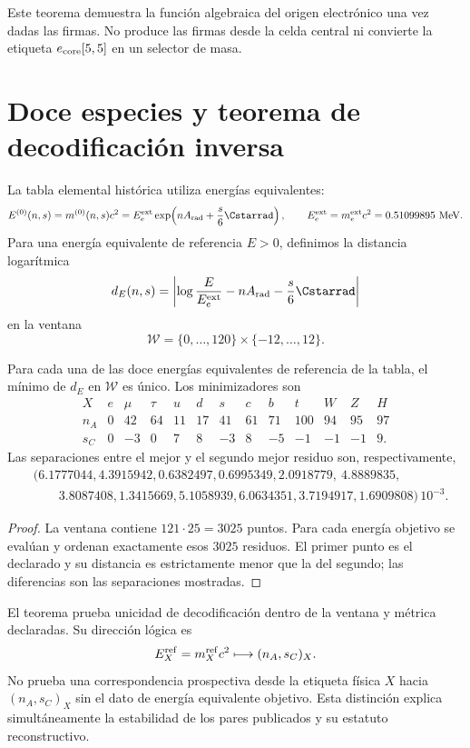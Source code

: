 Este teorema demuestra la función algebraica del origen electrónico una vez
dadas las firmas. No produce las firmas desde la celda central ni convierte
la etiqueta \(e_{\rm core}[5,5]\) en un selector de masa.

\section{Doce especies y teorema de decodificación inversa}

La tabla elemental histórica utiliza energías equivalentes:
\[
 E^{(0)}(n,s)=m^{(0)}(n,s)c^2
 =E_e^{\rm ext}
 \exp\!\left(nA_{\rm rad}+\frac{s}{6}\Cstarrad\right),
 \qquad E_e^{\rm ext}=m_e^{\rm ext}c^2
 =0.51099895\ \mathrm{MeV}.
\]
Para una energía equivalente de referencia \(E>0\), definimos la distancia logarítmica
\[
 d_E(n,s)=
 \left|
 \log\frac{E}{E_e^{\rm ext}}
 -nA_{\rm rad}-\frac{s}{6}\Cstarrad
 \right|
\]
en la ventana
\[
 \mathcal W=\{0,\ldots,120\}\times\{-12,\ldots,12\}.
\]

\begin{theorem}
\label{thm:voronoi-doce-especies}
Para cada una de las doce energías equivalentes de referencia de la tabla, el
mínimo de \(d_E\) en \(\mathcal W\) es único. Los minimizadores son
\[
\begin{array}{c|rrrrrrrrrrrr}
X&e&\mu&\tau&u&d&s&c&b&t&W&Z&H\\ \hline
n_A&0&42&64&11&17&41&61&71&100&94&95&97\\
s_C&0&-3&0&7&8&-3&8&-5&-1&-1&-1&9.
\end{array}
\]
Las separaciones entre el mejor y el segundo mejor residuo son,
respectivamente,
\[
\begin{aligned}
 &(6.1777044,4.3915942,0.6382497,0.6995349,2.0918779,\
 4.8889835,\\
 &\qquad 3.8087408,1.3415669,5.1058939,6.0634351,
 3.7194917,1.6909808)\,10^{-3}.
\end{aligned}
\]
\end{theorem}
\begin{proof}
La ventana contiene \(121\cdot25=3025\) puntos. Para cada energía objetivo se evalúan y
ordenan exactamente esos \(3025\) residuos. El primer punto es el declarado
y su distancia es estrictamente menor que la del segundo; las diferencias
son las separaciones mostradas.
\end{proof}

El teorema prueba unicidad de decodificación dentro de la ventana y métrica
declaradas. Su dirección lógica es
\[
 E_X^{\rm ref}=m_X^{\rm ref}c^2\longmapsto(n_A,s_C)_X.
\]
No prueba una correspondencia prospectiva desde la etiqueta física \(X\)
hacia \((n_A,s_C)_X\) sin el dato de energía equivalente objetivo. Esta
distinción explica simultáneamente la estabilidad de
los pares publicados y su estatuto reconstructivo.

